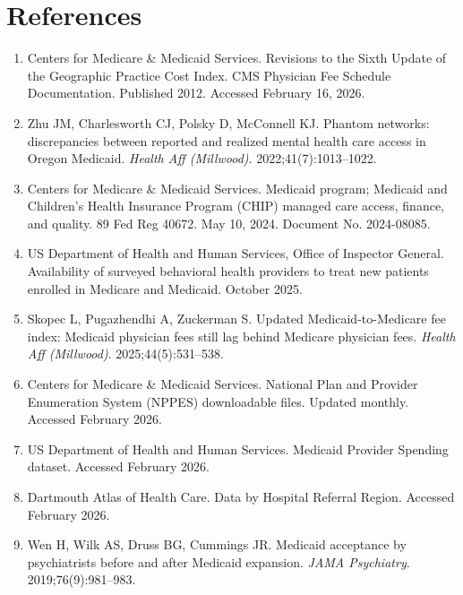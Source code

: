 \documentclass[12pt]{article}
\begin{document}

\newpage
\section*{References}

\begin{enumerate}
\item Centers for Medicare \& Medicaid Services. Revisions to the Sixth Update of the Geographic Practice Cost Index. CMS Physician Fee Schedule Documentation. Published 2012. Accessed February 16, 2026.

\item Zhu JM, Charlesworth CJ, Polsky D, McConnell KJ. Phantom networks: discrepancies between reported and realized mental health care access in Oregon Medicaid. \textit{Health Aff (Millwood)}. 2022;41(7):1013--1022.

\item Centers for Medicare \& Medicaid Services. Medicaid program; Medicaid and Children's Health Insurance Program (CHIP) managed care access, finance, and quality. 89 Fed Reg 40672. May 10, 2024. Document No. 2024-08085.

\item US Department of Health and Human Services, Office of Inspector General. Availability of surveyed behavioral health providers to treat new patients enrolled in Medicare and Medicaid. October 2025.

\item Skopec L, Pugazhendhi A, Zuckerman S. Updated Medicaid-to-Medicare fee index: Medicaid physician fees still lag behind Medicare physician fees. \textit{Health Aff (Millwood)}. 2025;44(5):531--538.

\item Centers for Medicare \& Medicaid Services. National Plan and Provider Enumeration System (NPPES) downloadable files. Updated monthly. Accessed February 2026.

\item US Department of Health and Human Services. Medicaid Provider Spending dataset. Accessed February 2026.

\item Dartmouth Atlas of Health Care. Data by Hospital Referral Region. Accessed February 2026.

\item Wen H, Wilk AS, Druss BG, Cummings JR. Medicaid acceptance by psychiatrists before and after Medicaid expansion. \textit{JAMA Psychiatry}. 2019;76(9):981--983.


\end{enumerate}
\end{document}
